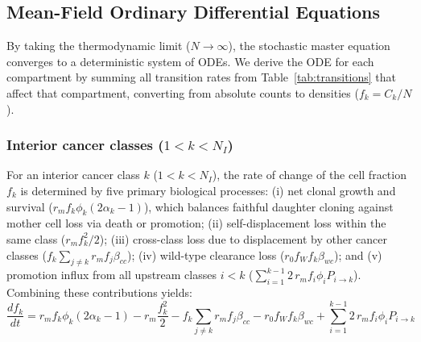 \documentclass[11pt,a4paper]{article}
\begin{document}

\subsection{Mean-Field Ordinary Differential Equations}

By taking the thermodynamic limit ($N \to \infty$), the stochastic master equation converges to a deterministic system of ODEs. We derive the ODE for each compartment by summing all transition rates from Table~\ref{tab:transitions} that affect that compartment, converting from absolute counts to densities ($f_k = C_k/N$).

\subsubsection*{Interior cancer classes ($1 < k < N_I$)}

For an interior cancer class $k$ ($1 < k < N_I$), the rate of change of the cell fraction $f_k$ is determined by five primary biological processes: (i) net clonal growth and survival ($r_m f_k \phi_k (2\alpha_k - 1)$), which balances faithful daughter cloning against mother cell loss via death or promotion; (ii) self-displacement loss within the same class ($r_m f_k^2 / 2$); (iii) cross-class loss due to displacement by other cancer classes ($f_k \sum_{j \neq k} r_m f_j \beta_{cc}$); (iv) wild-type clearance loss ($r_0 f_W f_k \beta_{wc}$); and (v) promotion influx from all upstream classes $i < k$ ($\sum_{i=1}^{k-1} 2\, r_m f_i \phi_i P_{i \to k}$). Combining these contributions yields:
\begin{equation}
    \frac{df_k}{dt} = r_m f_k \phi_k (2\alpha_k - 1)
    - r_m \frac{f_k^2}{2}
    - f_k \!\sum_{j \neq k}\! r_m f_j \beta_{cc}
    - r_0 f_W f_k \beta_{wc}
    + \sum_{i=1}^{k-1} 2\, r_m f_i \phi_i P_{i \to k}
\end{equation}
\end{document}
